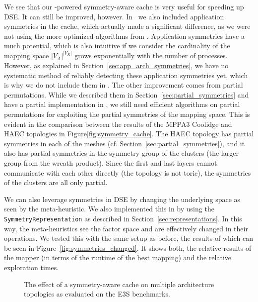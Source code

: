 We see that our \mpsym-powered symmetry-aware cache is very useful for speeding up \ac{DSE}.
It can still be improved, however.
In~\cite{goens_taco17} we also included application symmetries in the cache, which actually made a significant difference, as we were not using the more optimized algorithms from \mpsym.
Application symmetries have a much potential, which is also intuitive if we consider the cardinality of the mapping space $|V_A|^{|V_K|}$ grows exponentially with the number of processes.
However, as explained in Section~\ref{sec:app_arch_symmetries}, we have no systematic method of reliably detecting these application symmetries yet, which is why we do not include them in \mocasin.
The other improvement comes from partial permutations. While we described them in Section~\ref{sec:partial_symmetries} and have a partial implementation in \mpsym, we still need efficient algorithms on partial permutations for exploiting the partial symmetries of the mapping space.
This is evident in the comparison between the results of the MPPA3 Coolidge and \ac{HAEC} topologies in Figure\ref{fig:symmetry_cache}.
The \ac{HAEC} topology has partial symmetries in each of the meshes (cf. Section~\ref{sec:partial_symmetries}), and it also has partial symmetries in the symmetry group of the clusters (the larger group from the wreath product).
Since the first and last layers cannot communicate with each other directly (the topology is not toric), the symmetries of the clusters are all only partial.

We can also leverage symmetries in \ac{DSE} by changing the underlying space as seen by the meta-heuristic.
We also implemented this in \mocasin by using the \texttt{SymmetryRepresentation} as described in Section~\ref{sec:representations}.
In this way, the meta-heuristics see the factor space and are effectively changed in their operations.
We tested this with the same setup as before, the results of which can be seen in Figure~\ref{fig:symmetries_changed}.
It shows both, the relative results of the mapper (in terms of the runtime of the best mapping) and the relative exploration times.

\begin{figure}[h]
	\centering
   \resizebox{0.95\textwidth}{!}{}
	\caption{The effect of a symmetry-aware cache on multiple architecture topologies as evaluated on the \ac{E3S} benchmarks.}
	\label{fig:symmetry_changed_operations}
\end{figure}

